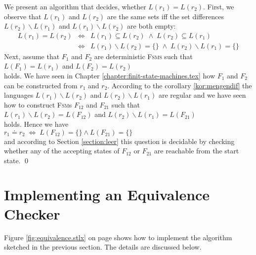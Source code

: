 \proofEng
We present an algorithm that decides, whether $L(r_1) = L(r_2)$.  First, we observe that 
$L(r_1)$ and $L(r_2)$ are the same sets iff the set differences $L(r_2) \backslash L(r_1)$ and $L(r_1) \backslash L(r_2)$
are both empty:
\begin{eqnarray*}
                  L(r_1) = L(r_2) 
&\Leftrightarrow& L(r_1) \subseteq L(r_2)         \;\wedge\; L(r_2) \subseteq L(r_1)          \\
&\Leftrightarrow& L(r_1) \backslash L(r_2) = \{\} \;\wedge\; L(r_2) \backslash L(r_1) = \{\}  
\end{eqnarray*}
Next, assume that $F_1$ and $F_2$ are deterministic \textsc{Fsms} such that
\\[0.2cm]
\hspace*{1.3cm}
$L(F_1) = L(r_1)$ \quad and \quad $L(F_2) = L(r_2)$
\\[0.2cm]
holds.  We have seen in Chapter \ref{chapter:finit-state-machines.tex} how $F_1$ and $F_2$ can be
constructed from $r_1$ and $r_2$. According to the corollary \ref{kor:mengendif} the languages
$L(r_1) \backslash L(r_2)$ and $L(r_2) \backslash L(r_1)$ are regular and we have seen how to
construct \textsc{Fsm}s $F_{12}$ and $F_{21}$ such that
\\[0.2cm]
\hspace*{1.3cm}
$L(r_1) \backslash L(r_2) = L(F_{12})$ \quad and \quad $L(r_2) \backslash L(r_1) = L(F_{21})$ 
\\[0.2cm]
holds.  Hence we have
\\[0.2cm]
\hspace*{1.3cm}
$r_1 \doteq r_2 \;\Leftrightarrow\; L(F_{12}) = \{\} \wedge  L(F_{21}) = \{\}$
\\[0.2cm]
and according to Section \ref{section:leer} this question is decidable by checking whether any of
the accepting states of $F_{12}$ or $F_{21}$ are reachable from the start state.
\qed

\section{Implementing an Equivalence Checker}
Figure \ref{fig:equivalence.stlx} on page \pageref{fig:equivalence.stlx} shows how to
implement the algorithm sketched in the previous section.  The details are discussed
below.

